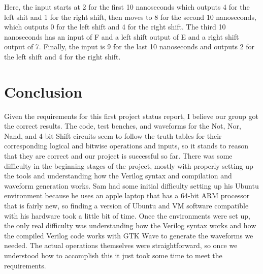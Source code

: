 \documentclass[runningheads, 12pt]{report}
\begin{document}
Here, the input starts at 2 for the first 10 nanoseconds which outputs 4 for the left shit and 1 for the right shift, then moves to 8 for the second 10 nanoseconds, which outputs 0 for the left shift and 4 for the right shift. The third 10 nanoseconds has an input of F and a left shift output of E and a right shift output of 7. Finally, the input is 9 for the last 10 nanoseconds and outputs 2 for the left shift and 4 for the right shift.  \pagebreak

\chapter{Conclusion}

	Given the requirements for this first project status report, I believe our group got the correct results. The code, test benches, and waveforms for the Not, Nor, Nand, and 4-bit Shift circuits seem to follow the truth tables for their corresponding logical and bitwise operations and inputs, so it stands to reason that they are correct and our project is successful so far. There was some difficulty in the beginning stages of the project, mostly with properly setting up the tools and understanding how the Verilog syntax and compilation and waveform generation works. Sam had some initial difficulty setting up his Ubuntu environment because he uses an apple laptop that has a 64-bit ARM processor that is fairly new, so finding a version of Ubuntu and VM software compatible with his hardware took a little bit of time. Once the environments were set up, the only real difficulty was understanding how the Verilog syntax works and how the compiled Verilog code works with GTK Wave to generate the waveforms we needed. The actual operations themselves were straightforward, so once we understood how to accomplish this it just took some time to meet the requirements. 	
\end{document}
